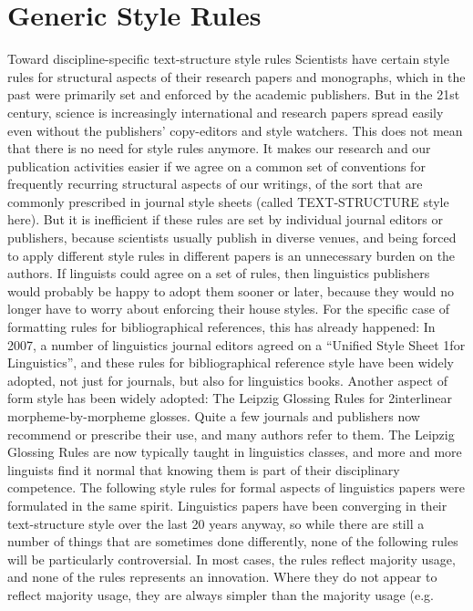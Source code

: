 \chapter{Generic Style Rules}
Toward discipline-specific text-structure style rules
Scientists have certain style rules for structural aspects of their research papers and
monographs, which in the past were primarily set and enforced by the academic publishers.
But in the 21st century, science is increasingly international and research papers spread
easily even without the publishers’ copy-editors and style watchers.
This does not mean that there is no need for style rules anymore. It makes our research
and our publication activities easier if we agree on a common set of conventions for
frequently recurring structural aspects of our writings, of the sort that are commonly
prescribed in journal style sheets (called TEXT-STRUCTURE style here). But it is inefficient if
these rules are set by individual journal editors or publishers, because scientists usually
publish in diverse venues, and being forced to apply different style rules in different papers
is an unnecessary burden on the authors. If linguists could agree on a set of rules, then
linguistics publishers would probably be happy to adopt them sooner or later, because they
would no longer have to worry about enforcing their house styles.
For the specific case of formatting rules for bibliographical references, this has already
happened: In 2007, a number of linguistics journal editors agreed on a “Unified Style Sheet
1for Linguistics”, and these rules for bibliographical reference style have been widely
adopted, not just for journals, but also for linguistics books.
Another aspect of form style has been widely adopted: The Leipzig Glossing Rules for
2interlinear morpheme-by-morpheme glosses. Quite a few journals and publishers now
recommend or prescribe their use, and many authors refer to them. The Leipzig Glossing
Rules are now typically taught in linguistics classes, and more and more linguists find it
normal that knowing them is part of their disciplinary competence.
The following style rules for formal aspects of linguistics papers were formulated in the
same spirit. Linguistics papers have been converging in their text-structure style over the
last 20 years anyway, so while there are still a number of things that are sometimes done
differently, none of the following rules will be particularly controversial. In most cases, the
rules reflect majority usage, and none of the rules represents an innovation. Where they do
not appear to reflect majority usage, they are always simpler than the majority usage (e.g.
